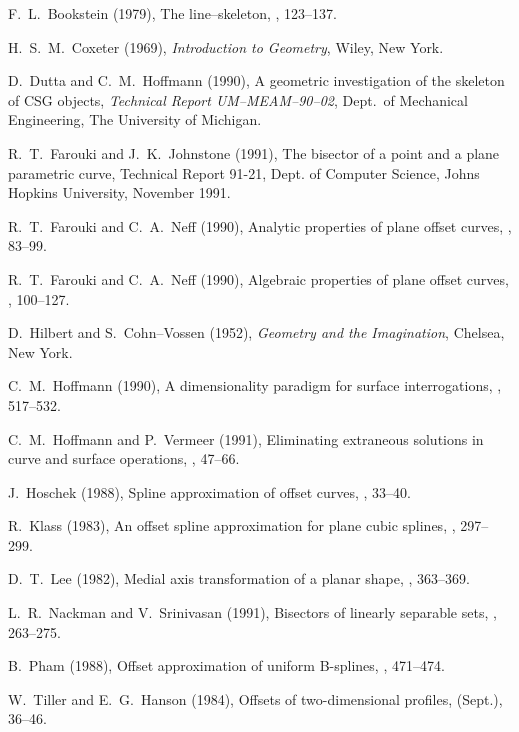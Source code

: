 \begin{thebibliography}{99}

F.~L.~Bookstein (1979), The line--skeleton, , 123--137.

H.~S.~M.~Coxeter (1969), {\it Introduction to Geometry}, Wiley,
New York.

D.~Dutta and C.~M.~Hoffmann (1990), A geometric investigation of the
skeleton of CSG objects, {\it Technical Report UM--MEAM--90--02},
Dept.\ of Mechanical Engineering, The University of Michigan.

R.~T.~Farouki and J.~K.~Johnstone (1991), The bisector of a point and a plane
parametric curve, Technical Report 91-21, Dept. of Computer Science,
Johns Hopkins University, November 1991.

R.~T.~Farouki and C.~A.~Neff (1990), Analytic properties of plane
offset curves, , 83--99.

R.~T.~Farouki and C.~A.~Neff (1990), Algebraic properties of plane
offset curves, , 100--127.

D.~Hilbert and S.~Cohn--Vossen (1952), {\it Geometry and the Imagination},
Chelsea, New York.

C.~M.~Hoffmann (1990), A dimensionality paradigm for surface interrogations,
, 517--532.

C.~M.~Hoffmann and P.~Vermeer (1991), Eliminating extraneous solutions in
curve and surface operations, , 47--66.

J.~Hoschek (1988), Spline approximation of offset curves, ,
33--40.

R.~Klass (1983), An offset spline approximation for plane cubic splines,
, 297--299.

D.~T.~Lee (1982), Medial axis transformation of a planar shape,
, 363--369.

L.~R.~Nackman and V.~Srinivasan (1991), Bisectors of linearly separable
sets, , 263--275.

B.~Pham (1988), Offset approximation of uniform B-splines, ,
471--474.

W.~Tiller and E.~G.~Hanson (1984), Offsets of two-dimensional profiles,
 (Sept.), 36--46.


\end{thebibliography}
